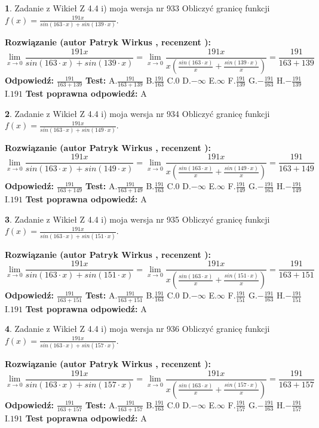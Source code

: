 \documentclass[12pt, a4paper]{article}
\theoremstyle{definition} %
\newtheorem{zad}{}
\newcommand{\zadStart}[1]{\begin{zad}#1\newline}
\newcommand{\zadStop}{\end{zad}}
\newcommand{\rozwStart}[2]{\noindent \textbf{Rozwiązanie (autor #1 , recenzent #2): }\newline}
\newcommand{\rozwStop}{\newline}
\newcommand{\odpStart}{\noindent \textbf{Odpowiedź:}\newline}
\newcommand{\odpStop}{\newline}
\newcommand{\testStart}{\noindent \textbf{Test:}\newline}
\newcommand{\testStop}{\newline}
\newcommand{\kluczStart}{\noindent \textbf{Test poprawna odpowiedź:}\newline}
\newcommand{\kluczStop}{\newline}
\begin{document}
\zadStart{Zadanie z Wikieł Z 4.4 i) moja wersja nr 933}
Obliczyć granicę funkcji $f(x)=\frac{191x}{sin(163\cdot x) +sin(139\cdot x)}$.
\zadStop
\rozwStart{Patryk Wirkus}{}
$$\lim\limits_{x\to 0}\frac{191x}{sin(163\cdot x) +sin(139\cdot x)}=\lim\limits_{x\to 0}\frac{191x}{x(\frac{sin(163\cdot x)}{x}+\frac{sin(139\cdot x)}{x})}=\frac{191}{163+139}$$
\rozwStop
\odpStart
$\frac{191}{163+139}$
\odpStop
\testStart
A.$\frac{191}{163+139}$
B.$\frac{191}{163}$
C.$0$
D.$-\infty$
E.$\infty$
F.$\frac{191}{139}$
G.$-\frac{191}{163}$
H.$-\frac{191}{139}$
I.$191$
\testStop
\kluczStart
A
\kluczStop



\zadStart{Zadanie z Wikieł Z 4.4 i) moja wersja nr 934}
Obliczyć granicę funkcji $f(x)=\frac{191x}{sin(163\cdot x) +sin(149\cdot x)}$.
\zadStop
\rozwStart{Patryk Wirkus}{}
$$\lim\limits_{x\to 0}\frac{191x}{sin(163\cdot x) +sin(149\cdot x)}=\lim\limits_{x\to 0}\frac{191x}{x(\frac{sin(163\cdot x)}{x}+\frac{sin(149\cdot x)}{x})}=\frac{191}{163+149}$$
\rozwStop
\odpStart
$\frac{191}{163+149}$
\odpStop
\testStart
A.$\frac{191}{163+149}$
B.$\frac{191}{163}$
C.$0$
D.$-\infty$
E.$\infty$
F.$\frac{191}{149}$
G.$-\frac{191}{163}$
H.$-\frac{191}{149}$
I.$191$
\testStop
\kluczStart
A
\kluczStop



\zadStart{Zadanie z Wikieł Z 4.4 i) moja wersja nr 935}
Obliczyć granicę funkcji $f(x)=\frac{191x}{sin(163\cdot x) +sin(151\cdot x)}$.
\zadStop
\rozwStart{Patryk Wirkus}{}
$$\lim\limits_{x\to 0}\frac{191x}{sin(163\cdot x) +sin(151\cdot x)}=\lim\limits_{x\to 0}\frac{191x}{x(\frac{sin(163\cdot x)}{x}+\frac{sin(151\cdot x)}{x})}=\frac{191}{163+151}$$
\rozwStop
\odpStart
$\frac{191}{163+151}$
\odpStop
\testStart
A.$\frac{191}{163+151}$
B.$\frac{191}{163}$
C.$0$
D.$-\infty$
E.$\infty$
F.$\frac{191}{151}$
G.$-\frac{191}{163}$
H.$-\frac{191}{151}$
I.$191$
\testStop
\kluczStart
A
\kluczStop



\zadStart{Zadanie z Wikieł Z 4.4 i) moja wersja nr 936}
Obliczyć granicę funkcji $f(x)=\frac{191x}{sin(163\cdot x) +sin(157\cdot x)}$.
\zadStop
\rozwStart{Patryk Wirkus}{}
$$\lim\limits_{x\to 0}\frac{191x}{sin(163\cdot x) +sin(157\cdot x)}=\lim\limits_{x\to 0}\frac{191x}{x(\frac{sin(163\cdot x)}{x}+\frac{sin(157\cdot x)}{x})}=\frac{191}{163+157}$$
\rozwStop
\odpStart
$\frac{191}{163+157}$
\odpStop
\testStart
A.$\frac{191}{163+157}$
B.$\frac{191}{163}$
C.$0$
D.$-\infty$
E.$\infty$
F.$\frac{191}{157}$
G.$-\frac{191}{163}$
H.$-\frac{191}{157}$
I.$191$
\testStop
\kluczStart
A
\kluczStop
\end{document}
